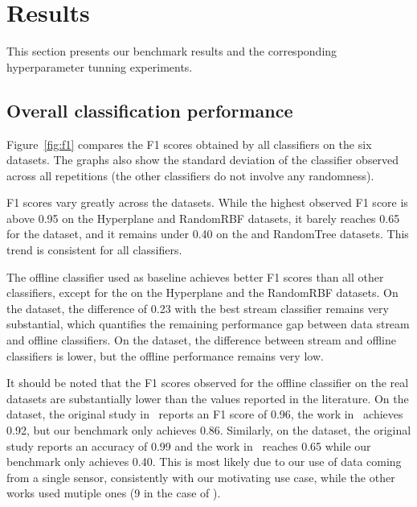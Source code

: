 \section{Results}
This section presents our benchmark results and the corresponding
hyperparameter tunning experiments.


\subsection{Overall classification performance}

Figure~\ref{fig:f1} compares the F1 scores obtained by all classifiers on
the six datasets. The graphs also show the standard deviation of the
\mondrianforest classifier observed across all repetitions (the other
classifiers do not involve any randomness). 

F1 scores vary greatly across the datasets. While the highest
observed F1 score is above 0.95 on the Hyperplane and RandomRBF datasets,
it barely reaches 0.65 for the \banosdataset dataset, and it remains under
0.40 on the \recofitdataset and RandomTree datasets. This trend is
consistent for all classifiers.

The offline \knn classifier used as baseline achieves better F1 scores than
all other classifiers, except for the \mondrianforest on the Hyperplane and
the RandomRBF datasets. On the \banosdataset dataset, the difference of
0.23 with the best stream classifier remains very substantial, which
quantifies the remaining performance gap between data stream and offline
classifiers. On the \recofitdataset dataset, the difference between stream
and offline classifiers is lower, but the offline performance remains very
low.

It should be noted that the F1 scores observed for the offline \knn
classifier on the real datasets are substantially lower than the values
reported in the literature. On the \banosdataset dataset, the original
study in~\cite{Banos_2014} reports an F1 score of 0.96, the work
in~\cite{behzad2019} achieves 0.92, but our benchmark only achieves 0.86.
Similarly, on the \recofitdataset dataset, the original study reports an
accuracy of 0.99 and the
work in~\cite{behzad2019} reaches 0.65 while our benchmark only achieves
0.40. This is most likely due to our use of data coming from a single
sensor, consistently with our motivating use case, while the other works used
mutiple ones (9 in the case of
\banosdataset).

